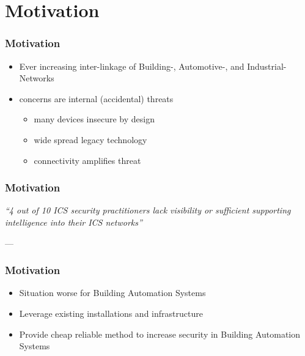 
\section{Motivation}
\begin{frame}[c]
	\frametitle{Motivation}
	\begin{itemize}
		\item Ever increasing inter-linkage of Building-, Automotive-, and Industrial-Networks
		\item concerns are internal (accidental) threats \parencite{Gregory-Brown2017}
			\begin{itemize}
				\item many devices insecure by design
				\item wide spread legacy technology
				\item connectivity amplifies threat
			\end{itemize}
	\end{itemize}
	
	\note{}
\end{frame}

\begin{frame}[c]
	\frametitle{Motivation}
	\textit{\enquote{4 out of 10 ICS security practitioners lack visibility or sufficient supporting intelligence into their ICS networks}}
	
	\hspace{60mm} --- \textcite{Gregory-Brown2017}
\end{frame}

\begin{frame}[c]
	\frametitle{Motivation}
	\begin{itemize}
		\item Situation worse for Building Automation Systems
		\item Leverage existing installations and infrastructure
		\item Provide cheap reliable method to increase security in Building Automation Systems
	\end{itemize}
\end{frame}